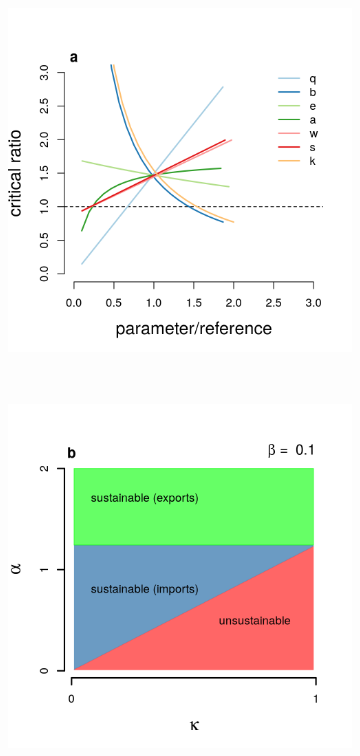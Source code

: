 \documentclass[12pt]{article}
\begin{document}
\begin{figure}[t!]
  \begin{subfigure}{0.5\textwidth}
      \includegraphics[scale=0.6]{figure_2a.png}
  \end{subfigure}%
  ~%
  \begin{subfigure}{0.5\textwidth}
      \includegraphics[scale=0.6]{figure_2b.png}
  \end{subfigure}


\end{figure}
\end{document}
